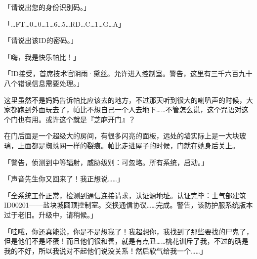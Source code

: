 





{\mtzh 「请说出您的身份识别码。」}

「\dots FT\dots 0\dots 0\dots 1\dots 6\dots 5\dots RD\dots C\dots 1\dots G\dots A」



{\mtzh 「请说出该ID的密码。」}


「嗨，我是快乐帕比！」

{\mtzh 「ID接受，首席技术官阴雨·黛丝。允许进入控制室。警告，这里有三千六百九十八个错误信息需要处理。」}




这里虽然不是妈妈告诉帕比应该去的地方，不过那天听到很大的喇叭声的时候，大家都跑到外面玩去了，帕比不想自己一个人去地下……不管怎么说，这个咒语对这个门也有用。或许这个就是『芝麻开门』？

在门后面是一个超级大的房间，有很多闪亮的面板，远处的墙实际上是一大块玻璃，上面都是蜘蛛网一样的裂痕。帕比走进屋子的时候，门就在她身后关上。

「{\mtzh 警告，侦测到中等辐射，威胁级别：可忽略。所有系统，启动。}」

「声音先生你又回来了！我正想说……」

「{\mtzh 全系统工作正常，检测到通信连接请求，认证源地址。认证完毕：士气部建筑ID00201——盐块城圆顶控制室。交换通信协议……完成。警告，该防护服系统版本过于老旧。升级中，请稍候。}」

「哇哦，你还真能说，你是不是想我了！我超想你，我找到了那些要找的尸鬼了，但是他们不是坏蛋！而且他们很和善，就是有点丑……桃花训斥了我，不过的确是我的不好，所以我说对不起他们说没关系！然后软气给我一个……」

